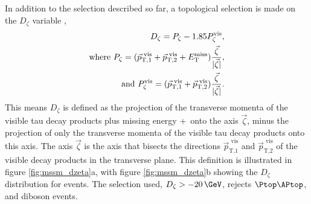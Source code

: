 In addition to the selection described so far,
 a topological selection is made on the $D_{\zeta}$ variable \cite{cdf-dzeta},
\begin{align}\label{eqn:mssm_em_dzeta}
D_{\zeta} = P_{\zeta} - 1.85 P_{\zeta}^{\text{vis}}, \notag \\
\text{where } P_{\zeta} = (\vec{p}_{\text{T},1}^{\text{  vis}} + \vec{p}_{\text{T},2}^{\text{  vis}} + E_{\text{T}}^{\text{miss}})\frac{\vec{\zeta}}{|\vec{\zeta}|}, \notag \\
\text{and } P_{\zeta}^{\text{vis}} = (\vec{p}_{\text{T},1}^{\text{  vis}}+\vec{p}_{\text{T},2}^{\text{  vis}})\frac{\vec{\zeta}}{|\vec{\zeta}|}.
\end{align}
This means $D_{\zeta}$ is defined as the projection of the transverse momenta of the visible tau decay products plus missing energy \pT+\MET~onto 
the axis $\vec{\zeta}$, minus the projection of only the transverse momenta of the visible tau decay products onto this axis.
The axis $\vec{\zeta}$ is the axis that bisects
the directions $\vec{p}_{\text{T,1}}^{\text{  vis}}$ and $\vec{p}_{\text{T,2}}^{\text{  vis}}$
of the visible decay products in the transverse plane. This definition is illustrated in figure
\ref{fig:mssm_dzeta}a, with figure \ref{fig:mssm_dzeta}b showing the $D_{\zeta}$ distribution
for \emu events. The selection used, $D_{\zeta} > -20\,\GeV$, rejects $\ttbar$, \Wjets and diboson
events. 

